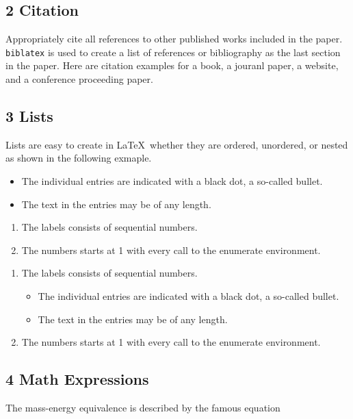 \documentclass[10pt]{article}
\begin{document}
\subsection*{2 Citation}
Appropriately cite all references to other published works included in the paper. \texttt{biblatex} is used to create a list of references or bibliography as the last section in the paper. Here are citation examples for a book\cite{latexcompanion}, a jouranl paper\cite{einstein}, a website\cite{knuthwebsite}, and a conference proceeding paper\cite{maurer}.

\subsection*{3 Lists}
Lists are easy to create in  \LaTeX\ whether they are ordered, unordered, or nested as shown in the following exmaple.

\begin{itemize}[noitemsep]
  \item The individual entries are indicated with a black dot, a so-called bullet.
  \item The text in the entries may be of any length.
\end{itemize}

\begin{enumerate}[noitemsep]
  \item The labels consists of sequential numbers.
  \item The numbers starts at 1 with every call to the enumerate environment.
\end{enumerate}

\begin{enumerate}[noitemsep]
   \item The labels consists of sequential numbers.
   \begin{itemize}[noitemsep]
     \item The individual entries are indicated with a black dot, a so-called bullet.
     \item The text in the entries may be of any length.
   \end{itemize}
   \item The numbers starts at 1 with every call to the enumerate environment.
\end{enumerate}

\subsection*{4 Math Expressions}
The mass-energy equivalence is described by the famous equation
\end{document}
